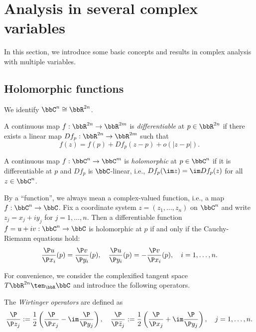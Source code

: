 \section{Analysis in several complex variables}

In this section, we introduce some basic concepts and results in complex analysis with multiple variables.

\subsection{Holomorphic functions}

    We identify \(\bbC^n \cong \bbR^{2n}\).

    \begin{definition}\label{def:differentiable_and_holomorphic_map}
        A continuous map \(f: \bbR^{2n} \to \bbR^{2m}\) is \emph{differentiable} at \(p \in \bbR^{2n}\) if there exists a linear map \(Df_p: \bbR^{2n} \to \bbR^{2m}\) such that 
        \[ f(z) = f(p) + Df_p(z - p) + o(|z - p|). \]

        A continuous map \(f: \bbC^n \to \bbC^m\) is \emph{holomorphic} at \(p \in \bbC^n\) if it is differentiable at \(p\) and \(Df_p\) is \(\bbC\)-linear, i.e., \(Df_p(\im z) = \im Df_p(z)\) for all \(z \in \bbC^n\).
    \end{definition}

    By a ``function'', we always mean a complex-valued function, i.e., a map \(f: \bbC^n \to \bbC\).
    Fix a coordinate system \(z = (z_1, \ldots, z_n)\) on \(\bbC^n\) and write \(z_j = x_j + iy_j\) for \(j = 1, \ldots, n\).
    Then a differentiable function \(f = u+iv: \bbC^n \to \bbC\) is holomorphic at \(p\) if and only if the Cauchy-Riemann equations hold:
    \[ \frac{\P u}{\P x_i}(p) = \frac{\P v}{\P y_i}(p), \quad \frac{\P u}{\P y_i}(p) = -\frac{\P v}{\P x_i}(p), \quad i = 1, \ldots, n. \]
    
    For convenience, we consider the complexified tangent space \(T\bbR^{2n} \ten_\bbR \bbC\) and introduce the following operators.

    \begin{definition}\label{def:Wirtinger_operators}
        The \emph{Wirtinger operators} are defined as 
        \[ \frac{\P}{\P z_j} := \frac{1}{2} \left( \frac{\P}{\P x_j} - \im \frac{\P}{\P y_j} \right), \quad \frac{\P}{\P \bar{z}_j} := \frac{1}{2} \left( \frac{\P}{\P x_j} + \im \frac{\P}{\P y_j} \right), \quad j = 1, \ldots, n. \]
    \end{definition}

